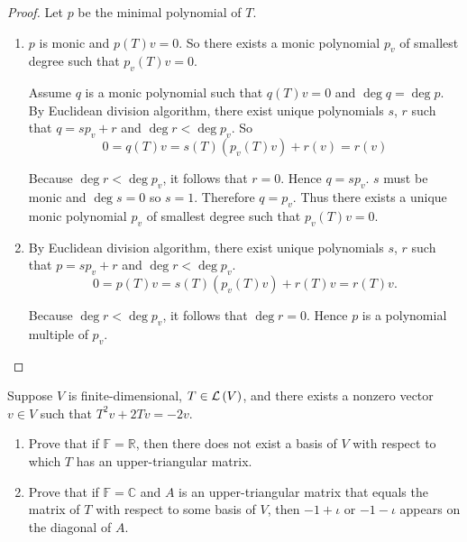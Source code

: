 \begin{proof}
    Let $p$ be the minimal polynomial of $T$.
    \begin{enumerate}[label={(\alph*)}]
        \item $p$ is monic and $p(T)v = 0$. So there exists a monic polynomial $p_{v}$ of smallest degree such that $p_{v}(T)v = 0$.

              Assume $q$ is a monic polynomial such that $q(T)v = 0$ and $\deg q = \deg p$. By Euclidean division algorithm, there exist unique polynomials $s$, $r$ such that $q = sp_{v} + r$ and $\deg r < \deg p_{v}$. So
              \[
                  0 = q(T)v = s(T)(p_{v}(T)v) + r(v) = r(v)
              \]

              Because $\deg r < \deg p_{v}$, it follows that $r = 0$. Hence $q = sp_{v}$. $s$ must be monic and $\deg s = 0$ so $s = 1$. Therefore $q = p_{v}$. Thus there exists a unique monic polynomial $p_{v}$ of smallest degree such that $p_{v}(T)v = 0$.
        \item By Euclidean division algorithm, there exist unique polynomials $s$, $r$ such that $p = sp_{v} + r$ and $\deg r < \deg p_{v}$.
              \[
                  0 = p(T)v = s(T)(p_{v}(T)v) + r(T)v = r(T)v.
              \]

              Because $\deg r < \deg p_{v}$, it follows that $\deg r = 0$. Hence $p$ is a polynomial multiple of $p_{v}$.
    \end{enumerate}
\end{proof}
\newpage

\begin{exercise}
    Suppose $V$ is finite-dimensional, $T \in \mathcal{L}\left({V}\right)$, and there exists a nonzero vector $v \in V$ such that $T^{2}v + 2Tv = -2v$.
    \begin{enumerate}[label={(\alph*)}]
        \item Prove that if $\mathbb{F} = \mathbb{R}$, then there does not exist a basis of $V$ with respect to which $T$ has an upper-triangular matrix.
        \item Prove that if $\mathbb{F} = \mathbb{C}$ and $A$ is an upper-triangular matrix that equals the matrix of $T$ with respect to some basis of $V$, then $-1 + \iota$ or $-1 - \iota$ appears on the diagonal of $A$.
    \end{enumerate}
\end{exercise}

